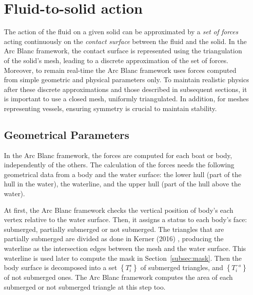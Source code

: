 \documentclass[final]{jcgt}
\def\Framework{The Arc Blanc framework\xspace}
\def\framework{the Arc Blanc framework\xspace}
\begin{document}
\section{Fluid-to-solid action}
\label{sec:fluidToSolidAction}
The action of the fluid on a given solid can be approximated by a \emph{set of forces} acting continuously on the \emph{contact surface} between the fluid and the solid.
In \framework, the contact surface is represented using the triangulation of the solid's mesh, leading to a discrete approximation of the set of forces.
Moreover, to remain real-time \framework uses forces computed from simple geometric and physical parameters only.
To maintain realistic physics after these discrete approximations and those described in subsequent sections, it is important to use a closed mesh, uniformly triangulated. In addition, for meshes representing vessels, ensuring symmetry is crucial to maintain stability.


\subsection{Geometrical Parameters}
\label{subsec:geomParam}
In \framework, the forces are computed for each boat or body, independently of the others.
The calculation of the forces needs the following geometrical data from a body and the water surface:
the lower hull (part of the hull in the water), the waterline, and the upper hull (part of the hull above the water).

At first, \framework checks the vertical position of body's each vertex relative to the water surface.
Then, it assigns a status to each body's face: submerged, partially submerged or not submerged.
The triangles that are partially submerged are divided as done in Kerner (2016) \cite{kernerWaterInteractionModel2016}, producing the waterline as the intersection edges between the mesh and the water surface.
This waterline is used later to compute the mask in Section~\ref{subsec:mask}.
Then the body surface is decomposed into a set $\left\lbrace T_i^s\right\rbrace$ of submerged triangles, and $\left\lbrace T_i^{\neg s}\right\rbrace$ of not submerged ones.
\Framework computes the area of each submerged or not submerged triangle at this step too.
\end{document}
